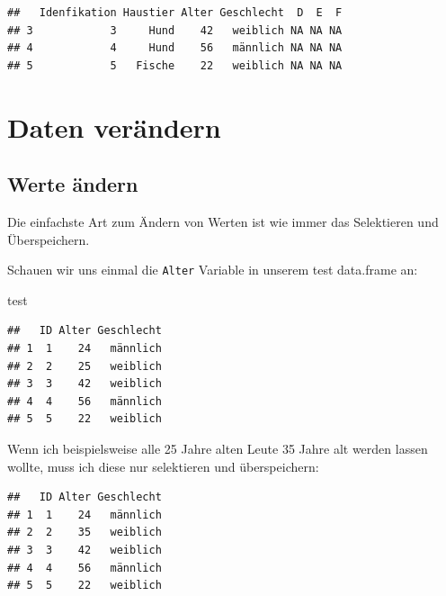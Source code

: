 \documentclass[
]{book}
\newenvironment{Shaded}{\begin{snugshade}}{\end{snugshade}}
\newcommand{\DecValTok}[1]{\textcolor[rgb]{0.00,0.00,0.81}{#1}}
\newcommand{\NormalTok}[1]{#1}
\newcommand{\OtherTok}[1]{\textcolor[rgb]{0.56,0.35,0.01}{#1}}
\newcommand{\SpecialCharTok}[1]{\textcolor[rgb]{0.81,0.36,0.00}{\textbf{#1}}}
\begin{document}
\begin{verbatim}
##   Idenfikation Haustier Alter Geschlecht  D  E  F
## 3            3     Hund    42   weiblich NA NA NA
## 4            4     Hund    56   männlich NA NA NA
## 5            5   Fische    22   weiblich NA NA NA
\end{verbatim}

\section{Daten verändern}\label{daten-veruxe4ndern}

\subsection{Werte ändern}\label{werte-uxe4ndern}

Die einfachste Art zum Ändern von Werten ist wie immer das Selektieren und Überspeichern.

Schauen wir uns einmal die \texttt{Alter} Variable in unserem test data.frame an:

\begin{Shaded}
\begin{Highlighting}[]
\NormalTok{test}
\end{Highlighting}
\end{Shaded}

\begin{verbatim}
##   ID Alter Geschlecht
## 1  1    24   männlich
## 2  2    25   weiblich
## 3  3    42   weiblich
## 4  4    56   männlich
## 5  5    22   weiblich
\end{verbatim}

Wenn ich beispielsweise alle 25 Jahre alten Leute 35 Jahre alt werden lassen wollte, muss ich diese nur selektieren und überspeichern:

\begin{Shaded}
\end{Shaded}

\begin{verbatim}
##   ID Alter Geschlecht
## 1  1    24   männlich
## 2  2    35   weiblich
## 3  3    42   weiblich
## 4  4    56   männlich
## 5  5    22   weiblich
\end{verbatim}
\end{document}
